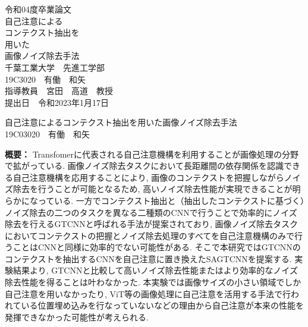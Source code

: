 \documentclass[a4paper,12pt,report]{jsbook}
\newenvironment{longbox}{%
  \def\FrameCommand{\fboxsep=\FrameSep \fbox}%
  \MakeFramed {\FrameRestore}}%
 {\endMakeFramed}
\begin{document}
%
%
\begin{titlepage}
\begin{center}
{\large 令和04度卒業論文\\}
\vspace{2.5cm}
{\fontsize{36pt}{40pt}\selectfont%
 自己注意による\\
 コンテクスト抽出を\\用いた\\画像ノイズ除去手法\\}
\vspace{3cm}
{\large%
  千葉工業大学　先進工学部　\\
  \vspace{3mm}19C3020　有働　和矢\\
  \vspace{3cm}指導教員　宮田　高道　教授\\
  \vspace{1cm}提出日　令和2023年1月17日\\
}%
\end{center}
\end{titlepage}

\begin{titlepage}
\begin{longbox}
\begin{center}
 {\Huge 自己注意によるコンテクスト抽出を用いた画像ノイズ除去手法\\}
 {\large%
   \vspace{3mm}%
   19C03020　有働　和矢\\
 }
\end{center}
{\bf 概要：}%
Transfomerに代表される自己注意機構を利用することが画像処理の分野で拡がっている. 画像ノイズ除去タスクにおいて長距離間の依存関係を認識できる自己注意機構を応用することにより, 画像のコンテクストを把握しながらノイズ除去を行うことが可能となるため, 高いノイズ除去性能が実現できることが明らかになっている. 一方でコンテクスト抽出と（抽出したコンテクストに基づく）ノイズ除去の二つのタスクを異なる二種類のCNNで行うことで効率的にノイズ除去を行えるGTCNNと呼ばれる手法が提案されており, 画像ノイズ除去タスクにおいてコンテクストの把握とノイズ除去処理のすべてを自己注意機構のみで行うことはCNNと同様に効率的でない可能性がある. そこで本研究ではGTCNNのコンテクストを抽出するCNNを自己注意に置き換えたSAGTCNNを提案する. 実験結果より, GTCNNと比較して高いノイズ除去性能またはより効率的なノイズ除去性能を得ることは叶わなかった. 本実験では画像サイズの小さい領域でしか自己注意を用いなかったり, ViT等の画像処理に自己注意を活用する手法で行われている位置埋め込みを行なっていないなどの理由から自己注意が本来の性能を発揮できなかった可能性が考えられる.
\\
\\
\end{longbox}
\end{titlepage}
\end{document}
